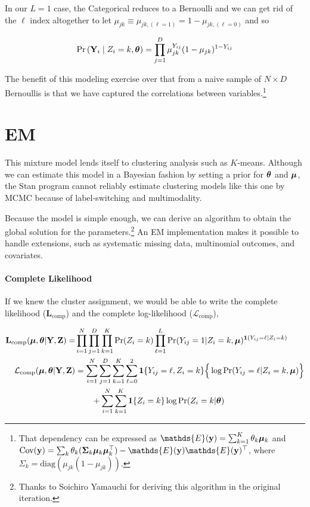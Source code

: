 \documentclass[11pt]{article}
\begin{document}
In our \(L = 1\) case, the Categorical reduces to a Bernoulli and we can get rid of the \(\ell\) index altogether to let  \(\mu_{jk} \equiv \mu_{jk,(\ell=1)} = 1 - \mu_{jk,(\ell=0)}\) and so

\begin{align}
\mathbb{\Pr}\left(\mathbf{Y}_{i} \mid Z_{i} = k, \bm{\theta}\right) = \prod^{D}_{j=1}\mu_{jk}^{Y_{ij}}(1 - \mu_{jk})^{1- Y_{ij}}
\end{align}




The benefit of this modeling exercise over that from a naive sample of
\(N \times D\) Bernoullis is that we have captured the correlations
between variables.\footnote{That dependency can be expressed as \(\mathds{E}(\by) = \sum_{k = 1}^{K} \theta_{k} \bmu_{k}\) and 
\(\cov({\by}) = \sum_{k} \theta_{k} (\mathbf{\Sigma}_k \bmu_k\bmu_{k}^{\top}) - \mathds{E}(\by)\mathds{E}(\by)^\top\), where \(\Sigma_k = \text{diag}(\mu_{jk}(1 - \mu_{jk}))\).}


\section{EM}

This mixture model lends itself to clustering analysis such as \(K\)-means. Although we can estimate this model in a Bayesian fashion by setting a prior for \(\bm{\theta}\) and \(\bm{\mu}\), the \textsf{Stan} program cannot reliably estimate clustering models like this one by MCMC because of label-switching and multimodality. 

Because the model is simple enough, we can derive an algorithm to obtain the global solution for the parameters.\footnote{Thanks to Soichiro Yamauchi for deriving this algorithm in the original iteration.} An EM implementation makes it possible to handle extensions, such as systematic missing data, multinomial outcomes, and covariates. 

\paragraph{Complete Likelihood} If we knew the cluster assignment, we would be able to write the complete likelihood (\(\mathbf{L}_{\text{comp}}\)) and the complete log-likelihood (\(\mathcal{L}_{\text{comp}}\)),


\begin{align}
\mathbf{L}_{\text{comp}}(\bm{\mu}, \bm{\theta} | \mathbf{Y}, \mathbf{Z}) =& \prod^{N}_{i=1}\prod^{D}_{j=1} \prod^{K}_{k = 1}\Pr(Z_i = k)  \prod^L_{\ell = 1}\Pr(Y_{ij}=  1 | Z_i = k, \bm{\mu})^{\bm{1}(Y_{ij} = \ell \mid Z_i = k)}\nonumber\\
\mathcal{L}_{\text{comp}}(\bm{\mu}, \bm{\theta}|\mathbf{Y}, \mathbf{Z})
& = \sum^{N}_{i=1}\sum^{D}_{j=1}\sum^{K}_{k=1}\sum^{2}_{\ell = 0}
\bm{1}\{Y_{ij} = \ell, Z_{i} = k\}\Big\{
\log \Pr(Y_{ij} = \ell | Z_{i} = k, \bm{\mu})
\Big\} \nonumber\\
& \qquad +
\sum^N_{i=1}\sum^{K}_{k=1}\bm{1}\{Z_{i} = k\}\log \Pr(Z_{i} = k | \bm{\theta})
\end{align}
\end{document}
